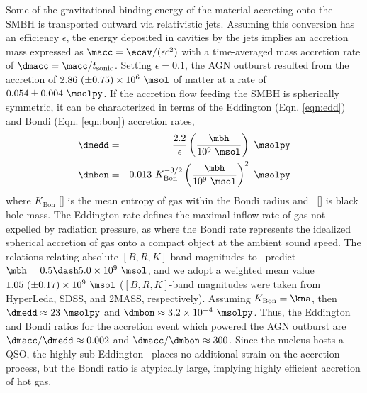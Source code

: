 \documentclass[useAMS,usenatbib]{mn2e}
\begin{document}
Some of the gravitational binding energy of the material accreting
onto the SMBH is transported outward via relativistic jets. Assuming
this conversion has an efficiency $\epsilon$, the energy deposited in
cavities by the jets implies an accretion mass expressed as $\macc =
\ecav/(\epsilon c^2)$ with a time-averaged mass accretion rate of
$\dmacc = \macc/t_{\mathrm{sonic}}$. Setting $\epsilon = 0.1$, the AGN
outburst resulted from the accretion of $2.86 ~(\pm 0.75) \times
10^{6} ~\msol$ of matter at a rate of $0.054 \pm 0.004 ~\msolpy$. If
the accretion flow feeding the SMBH is spherically symmetric, it can
be characterized in terms of the Eddington (Eqn. \ref{eqn:edd}) and
Bondi (Eqn. \ref{eqn:bon}) accretion rates,
\begin{eqnarray}
  \dmedd &=& \frac{2.2}{\epsilon} \left(\frac{\mbh}{10^9~\msol}\right)
  ~\msolpy  \label{eqn:edd}\\
  \dmbon &=& 0.013 ~K_{\mathrm{Bon}}^{-3/2} \left(\frac{\mbh}{10^9
    ~\msol}\right)^{2} ~\msolpy \label{eqn:bon}
\end{eqnarray}
where $K_{\mathrm{Bon}}$ [\ent] is the mean entropy of gas within the
Bondi radius and \mbh\ [\msol] is black hole mass. The Eddington rate
defines the maximal inflow rate of gas not expelled by radiation
pressure, as where the Bondi rate represents the idealized spherical
accretion of gas onto a compact object at the ambient sound speed. The
\citet{2007MNRAS.379..711G} relations relating absolute $[B,R,K]$-band
magnitudes to \mbh\ predict $\mbh = 0.5 \dash 5.0 \times 10^9 ~\msol$,
and we adopt a weighted mean value $1.05 ~(\pm 0.17) \times 10^9
~\msol$ ($[B,R,K]$-band magnitudes were taken from HyperLeda, SDSS,
and 2MASS, respectively). Assuming $K_{\mathrm{Bon}} = \kna$, then
$\dmedd \approx 23 ~\msolpy$ and $\dmbon \approx 3.2 \times 10^{-4}
~\msolpy$. Thus, the Eddington and Bondi ratios for the accretion
event which powered the AGN outburst are $\dmacc/\dmedd \approx 0.002$
and $\dmacc/\dmbon \approx 300$. Since the nucleus hosts a QSO, the
highly sub-Eddington \dmacc\ places no additional strain on the
accretion process, but the Bondi ratio is atypically large, implying
highly efficient accretion of hot gas.
\end{document}
